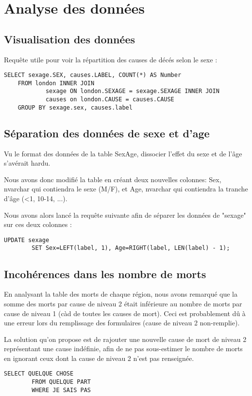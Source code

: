 \chapter{Analyse des données}

\section{Visualisation des données}

Requête utile pour voir la répartition des causes de décés selon le sexe :

\begin{lstlisting}[frame=single]
    SELECT sexage.SEX, causes.LABEL, COUNT(*) AS Number
    FROM london INNER JOIN
            sexage ON london.SEXAGE = sexage.SEXAGE INNER JOIN
            causes on london.CAUSE = causes.CAUSE
    GROUP BY sexage.sex, causes.label
\end{lstlisting}

\section{Séparation des données de sexe et d'age}

    Vu le format des données de la table SexAge, dissocier l'effet du sexe et de l'âge s'avérait hardu.

    Nous avons donc modifié la table en créant deux nouvelles colonnes: Sex, nvarchar qui contiendra le sexe (M/F), et Age,
    nvarchar qui contiendra la tranche d'âge (<1, 10-14, ...).

    Nous avons alors lancé la requête suivante afin de séparer les données de "sexage" sur ces deux colonnes :

    \begin{lstlisting}[frame=single]
        UPDATE sexage
        SET Sex=LEFT(label, 1), Age=RIGHT(label, LEN(label) - 1);
    \end{lstlisting}

\section{Incohérences dans les nombre de morts}

    En analysant la table des morts de chaque région, nous avons remarqué que la somme des morts par cause de niveau 2 était
    inférieure au nombre de morts par cause de niveau 1 (càd de toutes les causes de mort). Ceci est probablement dû à une
    erreur lors du remplissage des formulaires (cause de niveau 2 non-remplie).

    La solution qu'on propose est de rajouter une nouvelle cause de mort de niveau 2 représentant une cause indéfinie, afin
    de ne pas sous-estimer le nombre de morts en ignorant ceux dont la cause de niveau 2 n'est pas renseignée.

    \begin{lstlisting}[frame=single]
        SELECT QUELQUE CHOSE
        FROM QUELQUE PART
        WHERE JE SAIS PAS
    \end{lstlisting}